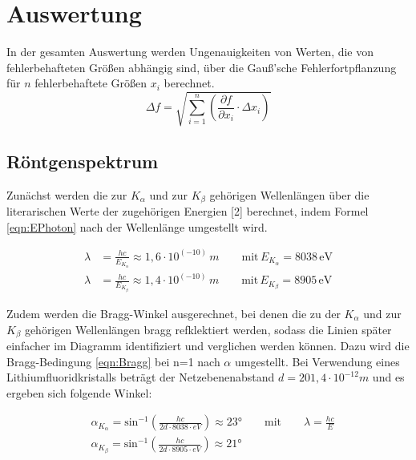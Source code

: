 \documentclass[titlepage = firstcover]{scrartcl}
\begin{document}
    \newpage
    \section{Auswertung}
        In der gesamten Auswertung werden Ungenauigkeiten von Werten, die von fehlerbehafteten Größen abhängig sind, über die Gauß'sche Fehlerfortpflanzung 
        für $n$ fehlerbehaftete Größen $x_i$ berechnet.
        \begin{equation}
            \Delta f = \sqrt{\sum_{i=1}^n \left(\frac{\partial f}{\partial x_i} \cdot \Delta x_i\right)}
        \end{equation}
        \subsection{Röntgenspektrum}
        Zunächst werden die zur $K_{\alpha}$ und zur $K_{\beta}$ gehörigen Wellenlängen über die literarischen Werte der zugehörigen Energien [2] 
        berechnet, indem Formel \ref{eqn:EPhoton} nach der Wellenlänge umgestellt wird.

        \begin{align}
            \lambda &= \frac{hc}{E_{K_{\alpha}}} \approx 1,6 \cdot 10^{\left(-10\right)}\,m \qquad \text{mit} \, E_{K_{\alpha}}=8038 \, \text{eV} \\
            \lambda &= \frac{hc}{E_{K_{\beta}}} \approx 1,4 \cdot 10^{\left(-10\right)}\,m \qquad \text{mit} \, E_{K_{\beta}}=8905 \, \text{eV}
        \end{align}

        \noindent
        Zudem werden die Bragg-Winkel ausgerechnet, bei denen die zu der $K_{\alpha}$ und zur $K_{\beta}$ gehörigen Wellenlängen bragg refklektiert werden, 
        sodass die Linien später einfacher im Diagramm identifiziert und verglichen werden können. Dazu wird die Bragg-Bedingung \ref{eqn:Bragg} bei n=1 
        nach $\alpha$ umgestellt. Bei Verwendung eines Lithiumfluoridkristalls beträgt der Netzebenenabstand $d=201,4 \cdot 10^{-12}m$ und es ergeben sich
        folgende Winkel:

        \begin{align}
            &\alpha_{K_{\alpha}} = \text{sin}^{-1}\left(\frac{hc}{2d \cdot 8038\cdot eV }\right) \approx 23° \qquad \text{mit} \qquad \lambda = \frac{hc}{E} \\
            &\alpha_{K_{\beta}}  = \text{sin}^{-1}\left(\frac{hc}{2d \cdot 8905\cdot eV }\right) \approx 21°
        \end{align}
\end{document}

